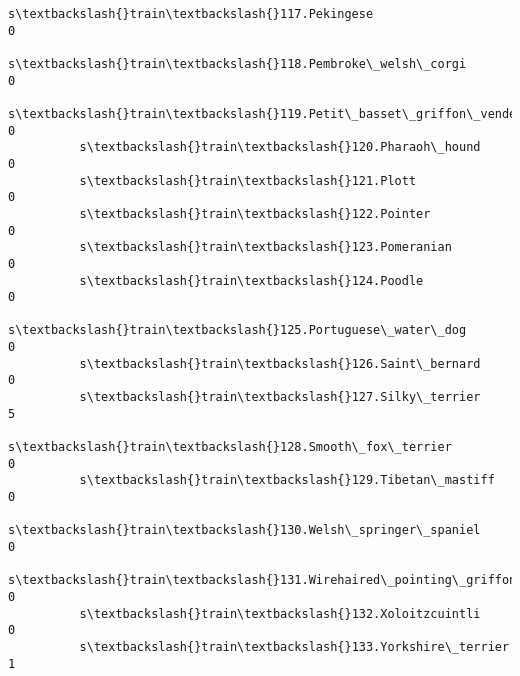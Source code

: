 \documentclass[11pt]{article}
\begin{document}
\begin{Verbatim}[commandchars=\\\{\}]
          s\textbackslash{}train\textbackslash{}117.Pekingese                                                   0   
          s\textbackslash{}train\textbackslash{}118.Pembroke\_welsh\_corgi                                        0   
          s\textbackslash{}train\textbackslash{}119.Petit\_basset\_griffon\_vendeen                                0   
          s\textbackslash{}train\textbackslash{}120.Pharaoh\_hound                                               0   
          s\textbackslash{}train\textbackslash{}121.Plott                                                       0   
          s\textbackslash{}train\textbackslash{}122.Pointer                                                     0   
          s\textbackslash{}train\textbackslash{}123.Pomeranian                                                  0   
          s\textbackslash{}train\textbackslash{}124.Poodle                                                      0   
          s\textbackslash{}train\textbackslash{}125.Portuguese\_water\_dog                                        0   
          s\textbackslash{}train\textbackslash{}126.Saint\_bernard                                               0   
          s\textbackslash{}train\textbackslash{}127.Silky\_terrier                                               5   
          s\textbackslash{}train\textbackslash{}128.Smooth\_fox\_terrier                                          0   
          s\textbackslash{}train\textbackslash{}129.Tibetan\_mastiff                                             0   
          s\textbackslash{}train\textbackslash{}130.Welsh\_springer\_spaniel                                      0   
          s\textbackslash{}train\textbackslash{}131.Wirehaired\_pointing\_griffon                                 0   
          s\textbackslash{}train\textbackslash{}132.Xoloitzcuintli                                              0   
          s\textbackslash{}train\textbackslash{}133.Yorkshire\_terrier                                           1   
          

\end{Verbatim}
\end{document}
